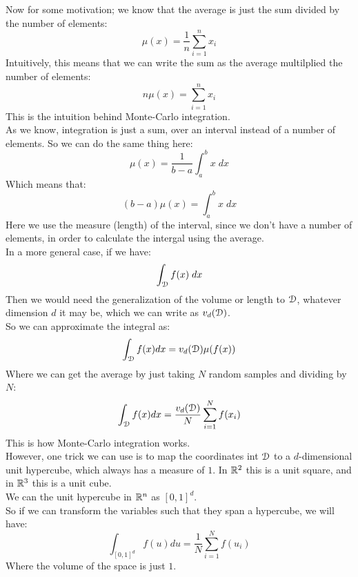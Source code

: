 \documentclass[12pt]{article}
\begin{document}
Now for some motivation;
we know that the average is just the
sum divided by the number of elements:
\[ \mu(x) = \dfrac{1}{n}\sum_{i=1}^n x_i \]
Intuitively, this means that we can write
the sum as the average multilplied the number
of elements:
\[ n\mu(x) = \sum_{i=1}^n x_i \]
This is the intuition behind Monte-Carlo
integration. \\

As we know, integration is just a sum,
over an interval instead of a number of elements.
So we can do the same thing here:
\[ \mu(x) = \dfrac{1}{b-a}\int_a^b x \; dx \]
Which means that:
\[ (b-a)\mu(x) = \int_a^b x \; dx \]
Here we use the measure (length)
of the interval, since we don't have a number
of elements, in order to calculate the intergal
using the average. \\

In a more general case, if we have:
\[ \int_{\mathcal{D}} f(x) \; dx \]
Then we would need the generalization
of the volume or length to $\mathcal{D}$,
whatever dimension $d$ it may be,
which we can write as $v_d(\mathcal{D})$. \\
So we can approximate the integral as:
\[ \int_{\mathcal{D}} f(x) dx
= v_d(\mathcal{D})\mu(f(x)) \]
Where we can get the average by just taking
$N$ random samples and dividing by $N$:
\[ \int_{\mathcal{D}} f(x) dx
= \dfrac{v_d(\mathcal{D})}{N} \sum_{i=1}^N f(x_i) \]
This is how Monte-Carlo integration works. \\

However, one trick we can use
is to map the coordinates int $\mathcal{D}$
to a $d$-dimensional unit hypercube,
which always has a measure of $1$.
In $\mathbb{R}^2$ this is a unit square,
and in $\mathbb{R}^3$ this is a unit cube. \\
We can the unit hypercube in $\mathbb{R}^n$ 
as $[0, 1]^d$. \\
So if we can transform the variables
such that they span a hypercube,
we will have:
\[ \int_{[0, 1]^d} f(u) du
= \dfrac{1}{N} \sum_{i=1}^N f(u_i)  \]
Where the volume of the space is just $1$. \\
\end{document}
